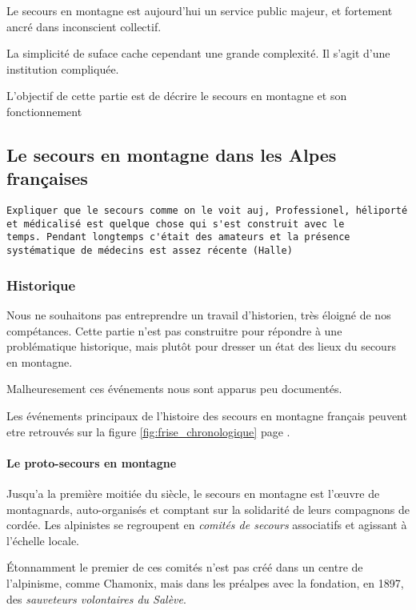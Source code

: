 Le secours en montagne est aujourd'hui un service public majeur, et
fortement ancré dans inconscient collectif.

La simplicité de suface cache cependant une grande complexité. Il
s'agit d'une institution compliquée.

L'objectif de cette partie est de décrire le secours en montagne et
son fonctionnement

\subsection{Le secours en montagne dans les Alpes françaises}
\label{subsec:1-1-1}


\begin{verbatim}
Expliquer que le secours comme on le voit auj, Professionel, héliporté
et médicalisé est quelque chose qui s'est construit avec le
temps. Pendant longtemps c'était des amateurs et la présence
systématique de médecins est assez récente (Halle)
\end{verbatim}

\subsubsection{Historique}
\label{subsubsec:1-1-1-1}

Nous ne souhaitons pas entreprendre un travail d'historien, très
éloigné de nos compétances. Cette partie n'est pas construitre pour
répondre à une problématique historique, mais plutôt pour dresser un
état des lieux du secours en montagne.

Malheuresement ces événements nous sont apparus peu documentés.

Les événements principaux de l'histoire des secours en montagne
français peuvent etre retrouvés sur la figure
\ref{fig:frise_chronologique} page \pageref{fig:frise_chronologique}.


\paragraph{Le proto-secours en montagne}
\label{par:1-1-1-1-1}

Jusqu'a la première moitiée du  siècle, le secours en
montagne est l’œuvre de montagnards, auto-organisés et comptant sur la
solidarité de leurs compagnons de cordée. Les alpinistes se regroupent
en \emph{comités de secours} associatifs et agissant à l'échelle
locale.

Étonnamment le premier de ces comités n'est pas créé dans un
centre de l'alpinisme, comme Chamonix, mais dans les préalpes avec la
fondation, en 1897, des \emph{sauveteurs volontaires du Salève}.


